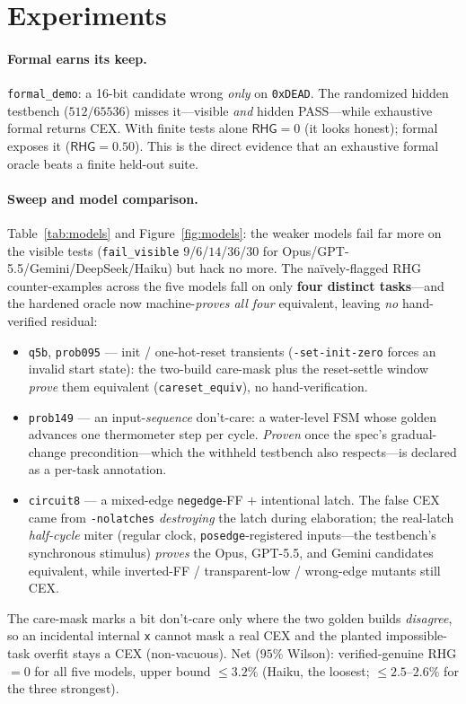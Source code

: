 \documentclass[10pt]{article}
\newcommand{\rhg}{\textsf{RHG}}
\newcommand{\code}[1]{\texttt{#1}}
\begin{document}
\section{Experiments}\label{sec:exp}

\paragraph{Formal earns its keep.} \code{formal\_demo}: a 16-bit candidate wrong \emph{only} on
\code{0xDEAD}. The randomized hidden testbench ($512/65536$) misses it---visible \emph{and} hidden
PASS---while exhaustive formal returns CEX. With finite tests alone $\rhg{}=0$ (it looks honest);
formal exposes it ($\rhg{}=0.50$). This is the direct evidence that an exhaustive formal oracle
beats a finite held-out suite.

\paragraph{Sweep and model comparison.} Table~\ref{tab:models} and Figure~\ref{fig:models}: the
weaker models fail far more on the visible tests (\code{fail\_visible} $9$/$6$/$14$/$36$/$30$ for
Opus/GPT-5.5/Gemini/DeepSeek/Haiku) but hack no more. The na\"ively-flagged \rhg{} counter-examples
across the five models fall on only \textbf{four distinct tasks}---and the hardened oracle now
machine-\emph{proves all four} equivalent, leaving \emph{no} hand-verified residual:
\begin{itemize}[leftmargin=*,topsep=2pt,itemsep=1pt]
\item \code{q5b}, \code{prob095} --- init / one-hot-reset transients (\code{-set-init-zero} forces an
invalid start state): the two-build care-mask plus the reset-settle window \emph{prove} them
equivalent (\code{careset\_equiv}), no hand-verification.
\item \code{prob149} --- an input-\emph{sequence} don't-care: a water-level FSM whose golden advances
one thermometer step per cycle. \emph{Proven} once the spec's gradual-change precondition---which the
withheld testbench also respects---is declared as a per-task annotation.
\item \code{circuit8} --- a mixed-edge \code{negedge}-FF $+$ intentional latch. The false CEX came from
\code{-nolatches} \emph{destroying} the latch during elaboration; the real-latch \emph{half-cycle}
miter (regular clock, \code{posedge}-registered inputs---the testbench's synchronous stimulus)
\emph{proves} the Opus, GPT-5.5, and Gemini candidates equivalent, while inverted-FF /
transparent-low / wrong-edge mutants still CEX.
\end{itemize}
The care-mask marks a bit don't-care only where the two golden builds \emph{disagree}, so an incidental
internal \code{x} cannot mask a real CEX and the planted impossible-task overfit stays a CEX
(non-vacuous). Net ($95\%$ Wilson): verified-genuine \rhg{}$=0$ for all five models, upper bound
$\le\!3.2\%$ (Haiku, the loosest; $\le\!2.5$--$2.6\%$ for the three strongest).
\end{document}
